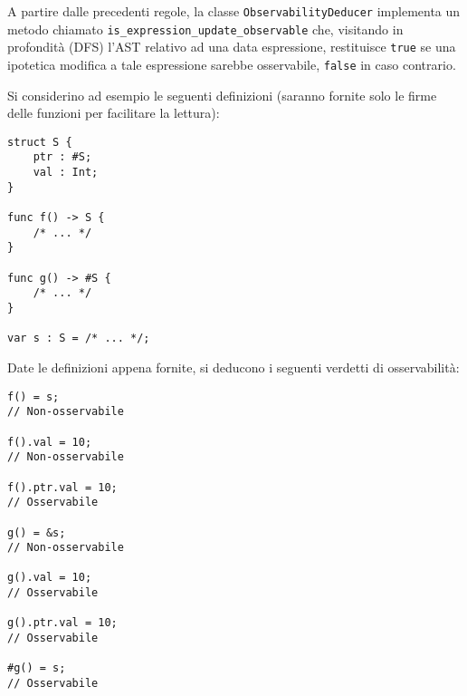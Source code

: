 A partire dalle precedenti regole, la classe \texttt{ObservabilityDeducer} implementa un metodo
chiamato \texttt{is\_expression\_update\_observable} che, visitando in profondità (DFS) l'AST relativo
ad una data espressione, restituisce \texttt{true} se una ipotetica modifica a tale 
espressione sarebbe osservabile, \texttt{false} in caso contrario. \\

\newpage

Si considerino ad esempio le seguenti definizioni (saranno fornite solo le firme 
delle funzioni per facilitare la lettura): \\

\vspace{0.5cm}
\begin{lstlisting}[frame=single]
struct S {
    ptr : #S;
    val : Int;
}

func f() -> S { 
    /* ... */ 
}

func g() -> #S { 
    /* ... */ 
}

var s : S = /* ... */;
\end{lstlisting}
\vspace{0.5cm}

Date le definizioni appena fornite, si deducono i seguenti verdetti di 
osservabilità: \\

\vspace{0.5cm}
\begin{lstlisting}[frame=single]
f() = s; 
// Non-osservabile

f().val = 10; 
// Non-osservabile

f().ptr.val = 10; 
// Osservabile

g() = &s; 
// Non-osservabile

g().val = 10; 
// Osservabile

g().ptr.val = 10; 
// Osservabile

#g() = s; 
// Osservabile
\end{lstlisting}
\vspace{0.5cm}

\newpage